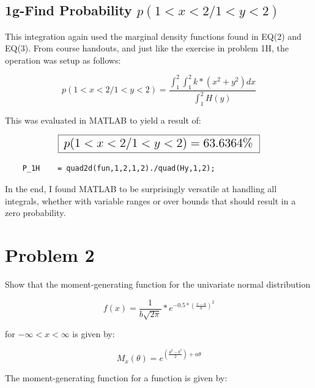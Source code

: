 \documentclass[]{article}
\begin{document}

\subsection*{  1g-Find Probability $ p(1 < x < 2/ 1 <  y < 2 )   $}

This integration again used the marginal density functions found in EQ(2) and EQ(3). From course handouts, and just like the exercise in problem 1H, the operation was setup as follows:

\begin{displaymath}
	p(1 < x < 2/ 1 <  y < 2 )  = \frac{   \int_1^2\int_1^2{k*(x^2+y^2) dx}  }{  \int_1^2{  H(y)  }   } 
\end{displaymath}   

\noindent This was evaluated in MATLAB to yield a result of:

\begin{displaymath}
	\fbox {   \Large $p(1 < x < 2/ 1 <  y < 2 )   =63.6364\%$  }
\end{displaymath}  


\begin{lstlisting}
	P_1H    = quad2d(fun,1,2,1,2)./quad(Hy,1,2);
\end{lstlisting}



In the end, I found MATLAB to be surprisingly versatile at handling all integrals, whether with variable ranges or over bounds that should result in a zero probability. 




\section{Problem 2}
Show that the moment-generating function for the univariate normal distribution

\begin{equation}
	f(x)= \frac{1}{b\sqrt{2\pi}}*e^{-0.5*(\frac{x-a}{b})^2}
\end{equation} 
 
\noindent for $-\infty < x < \infty $ is given by:

\begin{equation}
	M_x(\theta)= e^{(\frac{\theta^2-b^2}{2}) + a\theta}
\end{equation} 


\noindent The moment-generating function for a function is given by:
\end{document}
